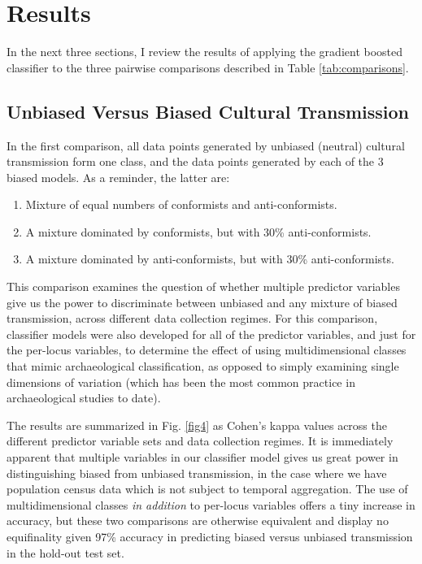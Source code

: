 \documentclass[10pt,letterpaper]{article}
\begin{document}
\section{Results}\label{results}

In the next three sections, I review the results of applying the gradient boosted classifier to the three pairwise comparisons described in Table \ref{tab:comparisons}.  

\subsection{Unbiased Versus Biased Cultural
Transmission}\label{unbiased-versus-biased-cultural-transmission}

In the first comparison, all data points generated by unbiased (neutral) cultural transmission form one class, and the data points generated by each of the 3 biased models.  As a reminder, the latter are:

\begin{enumerate}
\def\labelenumi{\arabic{enumi}.}
\itemsep1pt\parskip0pt
\item
  Mixture of equal numbers of conformists and anti-conformists.
\item
  A mixture dominated by conformists, but with 30\% anti-conformists.
\item
  A mixture dominated by anti-conformists, but with 30\%
  anti-conformists.
\end{enumerate}

This comparison examines the question of whether multiple predictor variables give us the power to discriminate between unbiased and any mixture of biased transmission, across different data collection regimes.  For this comparison, classifier models were also developed for all of the predictor variables, and just for the per-locus variables, to determine the effect of using multidimensional classes that mimic archaeological classification, as opposed to simply examining single dimensions of variation (which has been the most common practice in archaeological studies to date).  

The results are summarized in Fig. \ref{fig4} as Cohen's kappa values across the different predictor variable sets and data collection regimes.  It is immediately apparent that multiple variables in our classifier model gives us great power in distinguishing biased from unbiased transmission, in the case where we have population census data which is not subject to temporal aggregation.  The use of multidimensional classes \emph{in addition} to per-locus variables offers a tiny increase in accuracy, but these two comparisons are otherwise equivalent and display no equifinality given 97\% accuracy in predicting biased versus unbiased transmission in the hold-out test set.  
\end{document}
